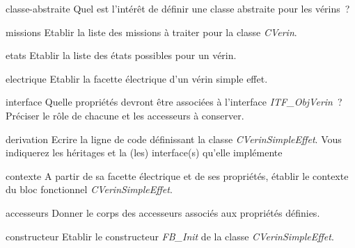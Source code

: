 {
  \begin{question}{classe-abstraite}
    Quel est l'intérêt de définir une classe abstraite pour les vérins~?
  \end{question}

  \begin{question}{missions}
    Etablir la liste des missions à traiter pour la classe \emph{CVerin}.
    \end{question}

    \begin{question}{etats}
        Etablir la liste des états possibles pour un vérin.
    \end{question}

    \begin{question}{electrique}
        Etablir la facette électrique d'un vérin simple effet.
    \end{question}

    \begin{question}{interface}
        Quelle propriétés devront être associées à l'interface \emph{ITF\_ObjVerin}~? Préciser le rôle de chacune et les accesseurs à conserver.
    \end{question}

    \begin{question}{derivation}
        Ecrire la ligne de code définissant la classe \emph{CVerinSimpleEffet}. Vous indiquerez les héritages et la (les) interface(s) qu'elle implémente
    \end{question}

    \begin{question}{contexte}
        A partir de sa facette électrique et de ses propriétés, établir le contexte du bloc fonctionnel \emph{CVerinSimpleEffet}.
    \end{question}

    \begin{question}{accesseurs}
        Donner le corps des accesseurs associés aux propriétés définies. 
    \end{question}

    \begin{question}{constructeur}
        Etablir le constructeur \emph{FB\_Init} de la classe \emph{CVerinSimpleEffet}.
    \end{question}

}
